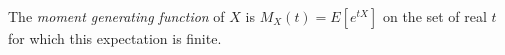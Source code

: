 
The \emph{moment generating function} of $X$ is $M_X(t)=E[e^{tX}]$ on the set of real $t$ for which this expectation is finite.
